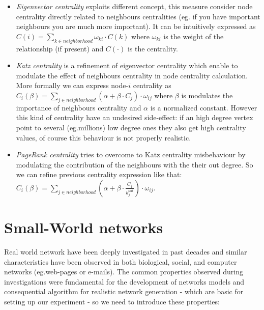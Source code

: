 \begin{description}
\begin{itemize}
\item \emph{Eigenvector centrality} exploits different concept, this measure consider node centrality directly related to neighbours centralities\cite[7.2]{newman:2010} (eg. if you have important neighbours you are much more important). It can be intuitively expressed as $C(i)=\sum_{k \in neighborhood}{\omega_{ki} \cdot C(k)}$ where $\omega_{ki}$ is the weight of the relationship (if present) and $C(\cdot)$ is the centrality.

\item \emph{Katz centrality} is a refinement of eigenvector centrality which enable to modulate the effect of neighbours centrality in node centrality calculation. More formally we can express node-$i$ centrality as $C_{i}(\beta)= \sum_{j \in neighborhood}{(\alpha + \beta \cdot C_{j})\cdot \omega_{ij}}$ where $\beta$ is modulates the importance of neighbours centrality and $\alpha$ is a normalized constant. However this kind of centrality have an undesired side-effect: if an high degree vertex point to several (eg.millions) low degree ones they also get high centrality values, of course this behaviour is not properly realistic\cite[7.4]{newman:2010}.

\item \emph{PageRank centrality} tries to overcome to Katz centrality misbehaviour by modulating the contribution of the neighbours with the their out degree. So we can refine previous centrality expression like that: $C_{i}(\beta)= \sum_{j \in neighborhood}{(\alpha + \beta \cdot \frac{C_{j}}{k_{j}^{out}} )\cdot \omega_{ij}}$.
\end{itemize}
\end{description}

\section{Small-World networks}
\label{sn_smallworld}
Real world network have been deeply investigated in past decades and similar characteristics have been observed in both biological, social, and computer networks (eg.web-pages or e-mails\cite{ebel02:_scale}). 
The common properties observed during investigations were fundamental for the development of networks models and consequential algorithm for realistic network generation - which are basic for setting up our experiment - so we need to introduce these properties:

